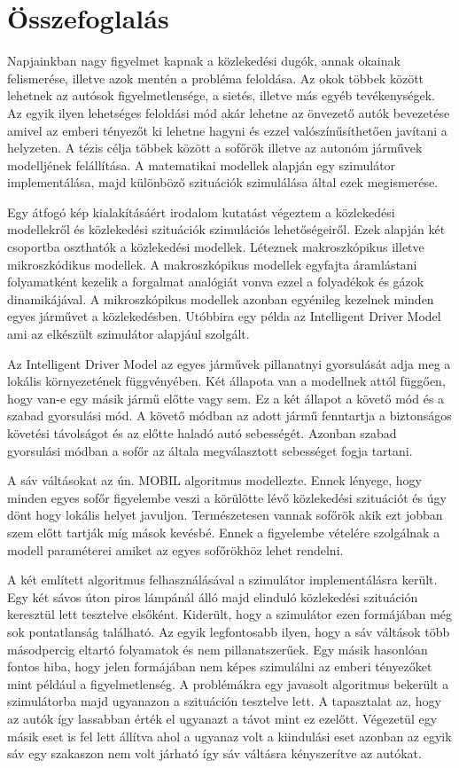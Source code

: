 \chapter*{Összefoglalás}
Napjainkban nagy figyelmet kapnak a közlekedési dugók, annak okainak felismerése, illetve azok mentén a probléma feloldása. Az okok többek között lehetnek az autósok figyelmetlensége, a sietés, illetve más egyéb tevékenységek. Az egyik ilyen lehetséges feloldási mód akár lehetne az önvezető autók bevezetése amivel az emberi tényezőt ki lehetne hagyni és ezzel valószínűsíthetően javítani a helyzeten. A tézis célja többek között a sofőrök illetve az autonóm járművek modelljének felállítása. A matematikai modellek alapján egy szimulátor implementálása, majd különböző szituációk szimulálása által ezek megismerése.

Egy átfogó kép kialakításáért irodalom kutatást végeztem a közlekedési modellekről és közlekedési szituációk szimulációs lehetőségeiről. Ezek alapján két csoportba oszthatók a közlekedési modellek. Léteznek makroszkópikus illetve mikroszkódikus modellek. A makroszkópikus modellek egyfajta áramlástani folyamatként kezelik a forgalmat analógiát vonva ezzel a folyadékok és gázok dinamikájával. A mikroszkópikus modellek azonban egyénileg kezelnek minden egyes járművet a közlekedésben. Utóbbira egy példa az Intelligent Driver Model ami az elkészült szimulátor alapjául szolgált.

Az Intelligent Driver Model az egyes járművek pillanatnyi gyorsulását adja meg a lokális környezetének függvényében. Két állapota van a modellnek attól függően, hogy van-e egy másik jármű előtte vagy sem. Ez a két állapot a követő mód és a szabad gyorsulási mód. A követő módban az adott jármű fenntartja a biztonságos követési távolságot és az előtte haladó autó sebességét. Azonban szabad gyorsulási módban a sofőr az általa megválasztott sebességet fogja tartani.

A sáv váltásokat az ún. MOBIL algoritmus modellezte. Ennek lényege, hogy minden egyes sofőr figyelembe veszi a körülötte lévő közlekedési szituációt és úgy dönt hogy lokális helyet javuljon. Természetesen vannak sofőrök akik ezt jobban szem előtt tartják míg mások kevésbé. Ennek a figyelembe vételére szolgálnak a modell paraméterei amiket az egyes sofőrökhöz lehet rendelni.

A két említett algoritmus felhasználásával a szimulátor implementálásra került. Egy két sávos úton piros lámpánál álló majd elinduló közlekedési szituáción keresztül lett tesztelve elsőként. Kiderült, hogy a szimulátor ezen formájában még sok pontatlanság található. Az egyik legfontosabb ilyen, hogy a sáv váltások több másodpercig eltartó folyamatok és nem pillanatszerűek.  Egy másik hasonlóan fontos hiba, hogy jelen formájában nem képes szimulálni az emberi tényezőket mint például a figyelmetlenség. A problémákra egy javasolt algoritmus bekerült a szimulátorba majd ugyanazon a szituáción tesztelve lett. A tapasztalat az, hogy az autók így lassabban érték el ugyanazt a távot mint ez ezelőtt. Végezetül egy másik eset is fel lett állítva ahol a ugyanaz volt a kiindulási eset azonban az egyik sáv egy szakaszon nem volt járható így sáv váltásra kényszerítve az autókat.

